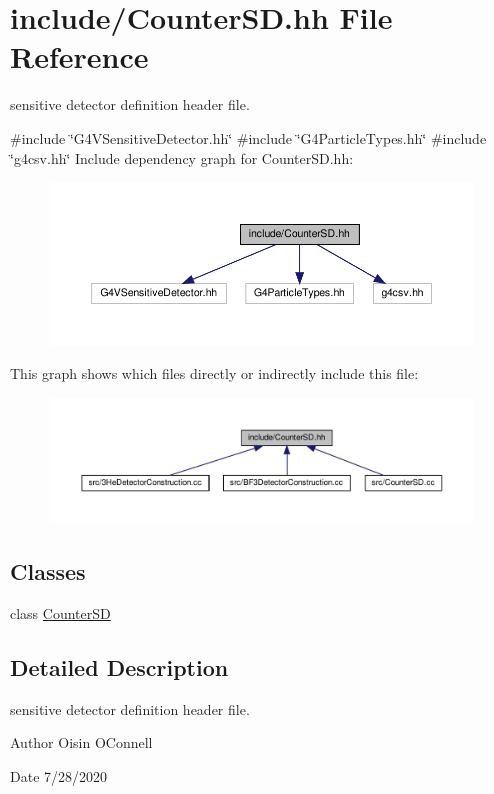 \hypertarget{CounterSD_8hh}{}\section{include/\+Counter\+SD.hh File Reference}
\label{CounterSD_8hh}


sensitive detector definition header file.  


{\ttfamily \#include \char`\"{}G4\+V\+Sensitive\+Detector.\+hh\char`\"{}}\newline
{\ttfamily \#include \char`\"{}G4\+Particle\+Types.\+hh\char`\"{}}\newline
{\ttfamily \#include \char`\"{}g4csv.\+hh\char`\"{}}\newline
Include dependency graph for Counter\+S\+D.\+hh\+:
\nopagebreak
\begin{figure}[H]
\begin{center}
\leavevmode
\includegraphics[width=350pt]{CounterSD_8hh__incl}
\end{center}
\end{figure}
This graph shows which files directly or indirectly include this file\+:
\nopagebreak
\begin{figure}[H]
\begin{center}
\leavevmode
\includegraphics[width=350pt]{CounterSD_8hh__dep__incl}
\end{center}
\end{figure}
\subsection*{Classes}
\begin{DoxyCompactItemize}
\item 
class \hyperlink{classCounterSD}{Counter\+SD}
\end{DoxyCompactItemize}


\subsection{Detailed Description}
sensitive detector definition header file. 

\begin{DoxyAuthor}{Author}
Oisin O\textquotesingle{}Connell 
\end{DoxyAuthor}
\begin{DoxyDate}{Date}
7/28/2020 
\end{DoxyDate}
